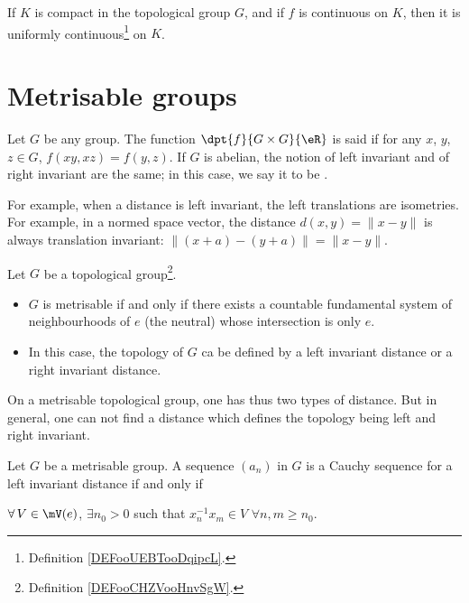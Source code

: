 \begin{proposition} \label{PROPooSHBAooVRdAFM}
    If \( K\) is compact in the topological group \( G\), and if \( f\) is continuous on \( K\), then it is uniformly continuous\footnote{Definition \ref{DEFooUEBTooDqipcL}.} on \( K\).
\end{proposition}

\section{Metrisable groups}\label{sec:metrisable_groups}

Let $G$ be any group. The function $\dpt{f}{G\times G}{\eR}$ is said  if for any $x$, $y$, $z\in G$, $f(xy,xz)=f(y,z)$. If $G$ is abelian, the notion of left invariant and of right invariant are the same; in this case, we say it to be .

For example, when a distance is left invariant, the left translations are isometries. For example, in a normed space vector, the distance $d(x,y)=\|x-y\|$ is always translation invariant: $\| (x+a)-(y+a) \|=\|x-y\|$.



\begin{proposition}
    Let $G$ be a topological group\footnote{Definition \ref{DEFooCHZVooHnvSgW}.}.
\begin{itemize}
\item $G$ is metrisable if and only if there exists a countable fundamental system of neighbourhoods of $e$ (the neutral) whose intersection is only $e$.
\item In this case, the topology of $G$ ca be defined by a left invariant distance or a right invariant distance.
\end{itemize}
\end{proposition}




On a metrisable topological group, one has thus two types of distance. But in general, one can not find a distance which defines the topology being left and right invariant.

\begin{proposition}
Let $G$ be a metrisable group. A sequence $(a_n)$ in $G$ is a Cauchy sequence for a left invariant distance if and only if

 $\forall\, V\in\mV(e)$, $\exists n_0>0$ such that $x_n^{-1} x_m\in V$ $\forall n,m\geq n_0$.
\label{prop:Cauchy_metrisable}
\end{proposition}

